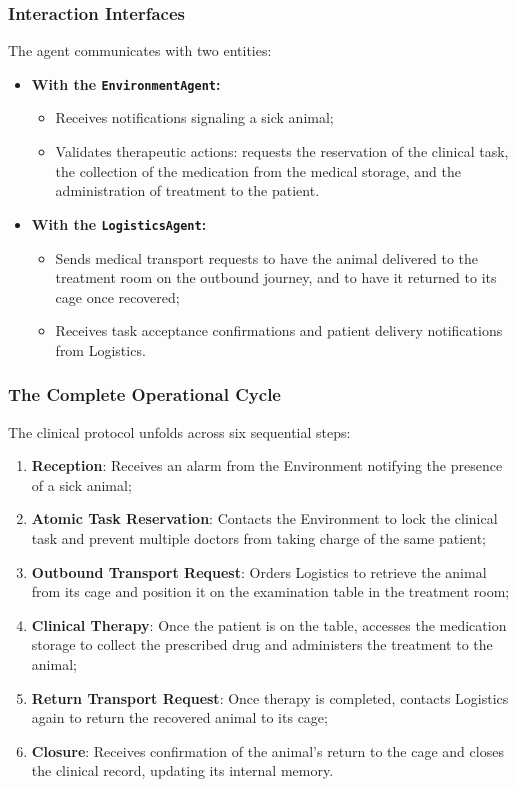 \documentclass{article}
\renewcommand{\_}{\oldtextunderscore\allowbreak}
\begin{document}
\subsubsection{Interaction Interfaces}
The agent communicates with two entities:
\begin{itemize}
    \item \textbf{With the \texttt{EnvironmentAgent}:}
    \begin{itemize}
        \item Receives notifications signaling a sick animal;
        \item Validates therapeutic actions: requests the reservation of the clinical task, the collection of the medication from the medical storage, and the administration of treatment to the patient.
    \end{itemize}
    \item \textbf{With the \texttt{LogisticsAgent}:}
    \begin{itemize}
        \item Sends medical transport requests to have the animal delivered to the treatment room on the outbound journey, and to have it returned to its cage once recovered;
        \item Receives task acceptance confirmations and patient delivery notifications from Logistics.
    \end{itemize}
\end{itemize}
\subsubsection{The Complete Operational Cycle}
The clinical protocol unfolds across six sequential steps:
\begin{enumerate}
    \item \textbf{Reception}: Receives an alarm from the Environment notifying the presence of a sick animal;
    \item \textbf{Atomic Task Reservation}: Contacts the Environment to lock the clinical task and prevent multiple doctors from taking charge of the same patient;
    \item \textbf{Outbound Transport Request}: Orders Logistics to retrieve the animal from its cage and position it on the examination table in the treatment room;
    \item \textbf{Clinical Therapy}: Once the patient is on the table, accesses the medication storage to collect the prescribed drug and administers the treatment to the animal;
    \item \textbf{Return Transport Request}: Once therapy is completed, contacts Logistics again to return the recovered animal to its cage;
    \item \textbf{Closure}: Receives confirmation of the animal's return to the cage and closes the clinical record, updating its internal memory.
\end{enumerate}
\end{document}
